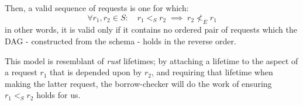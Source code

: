Then, a valid sequence of requests is one for which:\[
\forall{r_1,r_2\in{S}}\colon\quad
r_1 <_{S} r_2 \;\implies\; r_2 \nless_{E} r_1
\] in other words, it is valid only if it contains no ordered pair of requests which the DAG - constructed from the schema - holds in the reverse order.

This model is resemblant of \emph{rust} lifetimes; by attaching a lifetime to the aspect of a request $r_1$ that is depended upon by $r_2$, and requiring that lifetime when making the latter request, the borrow-checker will do the work of ensuring $r_1 <_{S} r_2$ holds for us.